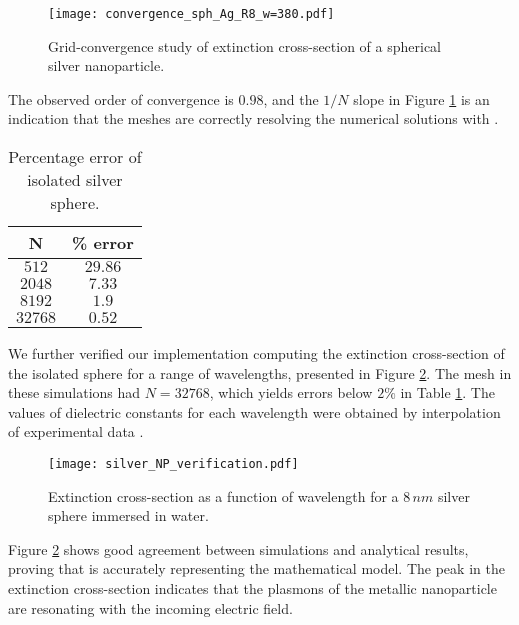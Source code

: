 \begin{figure}[h] %
   \centering
   \texttt{[image: convergence\_sph\_Ag\_R8\_w=380.pdf]} 
   \caption{Grid-convergence study of extinction cross-section of a spherical silver
            nanoparticle.}
   \label{fig:error_sphere_Ag}
\end{figure}

The observed order of convergence is $0.98$, and the $1/N$ slope in Figure \ref{fig:error_sphere_Ag}
is an indication that the meshes are correctly resolving the numerical solutions with \pygbe. 

\begin{table}[h]
    \centering
    \caption{\label{table:err_iso_sphere} Percentage error of isolated silver sphere.} 
    \begin{tabular}{c c}
    \hline%
    N & \% error \\
    \hline%
     $512$ & $29.86$ \\
     $2048$ & $7.33$ \\
     $8192$ & $1.9$ \\
     $32768$ & $0.52$ \\
    \hline%
    \end{tabular}
\end{table}

We further verified our implementation computing the extinction cross-section of the 
isolated sphere for a range of wavelengths, presented in Figure \ref{fig:verif_sphere}. 
The mesh in these simulations had $N=32768$, which yields errors below $2\%$ in Table \ref{table:err_iso_sphere}.
The values of dielectric constants for each wavelength were obtained by interpolation of 
experimental data \cite{JohnsonChristy1972, HaleQuerry1972}.

\begin{figure}[h] %
   \centering
   \texttt{[image: silver\_NP\_verification.pdf]} 
   \caption{Extinction cross-section as a function of wavelength for a $8 \, nm$
            silver sphere immersed in water.}
   \label{fig:verif_sphere}
\end{figure}

Figure \ref{fig:verif_sphere} shows good agreement between simulations and analytical results, proving
that \pygbe is accurately representing the mathematical model. The 
peak in the extinction cross-section indicates that the plasmons of the metallic
nanoparticle are resonating with the incoming electric field.


